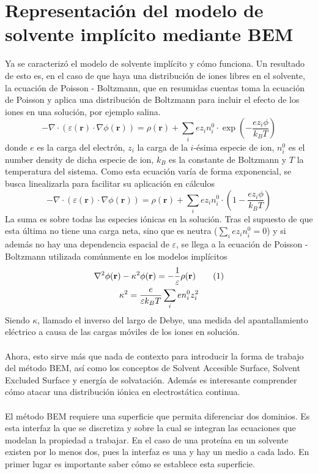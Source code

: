 \documentclass[12pt, oneside, numbers, spanish]{ezthesis}
\newcommand\numberthis{\addtocounter{equation}{1}\tag{\theequation}}
\numberwithin{equation}{section}
\begin{document}
\section{Representación del modelo de solvente implícito mediante BEM}\label{Sec: Implicit_Solvent}
Ya se caracterizó el modelo de solvente implícito y cómo funciona. Un resultado de esto es, en el caso de que haya una distribución de iones libres en el solvente, la ecuación de Poisson - Boltzmann, que en resumidas cuentas toma la ecuación de Poisson y aplica una distribución de Boltzmann para incluir el efecto de los iones en una solución, por ejemplo salina.
\begin{equation}
-\nabla\cdot(\varepsilon(\mathbf{r})\cdot\nabla\phi(\mathbf{r})) = \rho(\mathbf{r}) + \sum_i ez_in_i^0\cdot \exp\left(-\frac{ez_i\phi}{k_BT}\right)
\end{equation}
donde $e$ es la carga del electrón, $z_i$ la carga de la $i$-ésima especie de ion, $n_i^0$ es el number density de dicha especie de ion, $k_B$ es la constante de Boltzmann y $T$ la temperatura del sistema. Como esta ecuación varía de forma exponencial, se busca linealizarla para facilitar su aplicación en cálculos
\begin{equation}
-\nabla\cdot(\varepsilon(\mathbf{r})\cdot\nabla\phi(\mathbf{r})) = \rho(\mathbf{r}) + \sum_i ez_in_i^0\cdot \left(1 - \frac{ez_i\phi}{k_BT}\right)
\end{equation}
La suma es sobre todas las especies iónicas en la solución. Tras el supuesto de que esta última no tiene una carga neta, sino que es neutra ($\sum_i ez_in_i^0 = 0$) y si además no hay una dependencia espacial de $\varepsilon$, se llega a la ecuación de Poisson - Boltzmann utilizada comúnmente en los modelos implícitos
\begin{gather*}
\nabla^2\phi(\mathbf{r}) - \kappa^2\phi(\mathbf{r}) = - \frac{1}{\varepsilon}\rho(\mathbf{r})\numberthis \\
\kappa^2 = \frac{e}{\varepsilon k_BT}\sum_i en_i^0z_i^2
\end{gather*}
Siendo $\kappa$, llamado el inverso del largo de Debye, una medida del apantallamiento eléctrico a causa de las cargas móviles de los iones en solución.\\\\
Ahora, esto sirve más que nada de contexto para introducir la forma de trabajo del método BEM, así como los conceptos de Solvent Accesible Surface, Solvent Excluded Surface y energía de solvatación. Además es interesante comprender cómo atacar una distribución iónica en electrostática continua.\\\\
El método BEM requiere una superficie que permita diferenciar dos dominios. Es esta interfaz la que se discretiza y sobre la cual se integran las ecuaciones que modelan la propiedad a trabajar. En el caso de una proteína en un solvente existen por lo menos dos, pues la interfaz es una y hay un medio a cada lado. En primer lugar es importante saber cómo se establece esta superficie.
\end{document}
